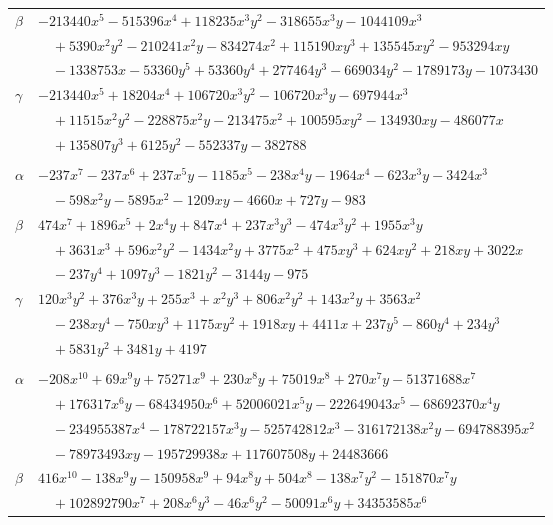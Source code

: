 \documentclass[11pt]{article}
\begin{document}
\begin{longtable}{@{}ll@{}}
$\beta$ & $-213440x^{5}-515396x^{4}+118235x^{3}y^{2}-318655x^{3}y-1044109x^{3}$\\
 & $\quad +5390x^{2}y^{2}-210241x^{2}y-834274x^{2}+115190xy^{3}+135545xy^{2}-953294xy$\\
 & $\quad -1338753x-53360y^{5}+53360y^{4}+277464y^{3}-669034y^{2}-1789173y-1073430$\\
$\gamma$ & $-213440x^{5}+18204x^{4}+106720x^{3}y^{2}-106720x^{3}y-697944x^{3}$\\
 & $\quad +11515x^{2}y^{2}-228875x^{2}y-213475x^{2}+100595xy^{2}-134930xy-486077x$\\
 & $\quad +135807y^{3}+6125y^{2}-552337y-382788$\\
\addlinespace[3pt]
\multicolumn{2}{@{}l}{$\{i,j\}=\{53,66\}$, $k_{ij}=2^{3}\cdot 3^{2}\cdot 5\cdot 7$}\\
$\alpha$ & $-237x^{7}-237x^{6}+237x^{5}y-1185x^{5}-238x^{4}y-1964x^{4}-623x^{3}y-3424x^{3}$\\
 & $\quad -598x^{2}y-5895x^{2}-1209xy-4660x+727y-983$\\
$\beta$ & $474x^{7}+1896x^{5}+2x^{4}y+847x^{4}+237x^{3}y^{3}-474x^{3}y^{2}+1955x^{3}y$\\
 & $\quad +3631x^{3}+596x^{2}y^{2}-1434x^{2}y+3775x^{2}+475xy^{3}+624xy^{2}+218xy+3022x$\\
 & $\quad -237y^{4}+1097y^{3}-1821y^{2}-3144y-975$\\
$\gamma$ & $120x^{3}y^{2}+376x^{3}y+255x^{3}+x^{2}y^{3}+806x^{2}y^{2}+143x^{2}y+3563x^{2}$\\
 & $\quad -238xy^{4}-750xy^{3}+1175xy^{2}+1918xy+4411x+237y^{5}-860y^{4}+234y^{3}$\\
 & $\quad +5831y^{2}+3481y+4197$\\
\addlinespace[3pt]
\multicolumn{2}{@{}l}{$\{i,j\}=\{53,88\}$, $k_{ij}=2^{6}\cdot 3^{5}\cdot 5\cdot 7^{3}\cdot 13$}\\
$\alpha$ & $-208x^{10}+69x^{9}y+75271x^{9}+230x^{8}y+75019x^{8}+270x^{7}y-51371688x^{7}$\\
 & $\quad +176317x^{6}y-68434950x^{6}+52006021x^{5}y-222649043x^{5}-68692370x^{4}y$\\
 & $\quad -234955387x^{4}-178722157x^{3}y-525742812x^{3}-316172138x^{2}y-694788395x^{2}$\\
 & $\quad -78973493xy-195729938x+117607508y+24483666$\\
$\beta$ & $416x^{10}-138x^{9}y-150958x^{9}+94x^{8}y+504x^{8}-138x^{7}y^{2}-151870x^{7}y$\\
 & $\quad +102892790x^{7}+208x^{6}y^{3}-46x^{6}y^{2}-50091x^{6}y+34353585x^{6}$\\

\end{longtable}
\end{document}
